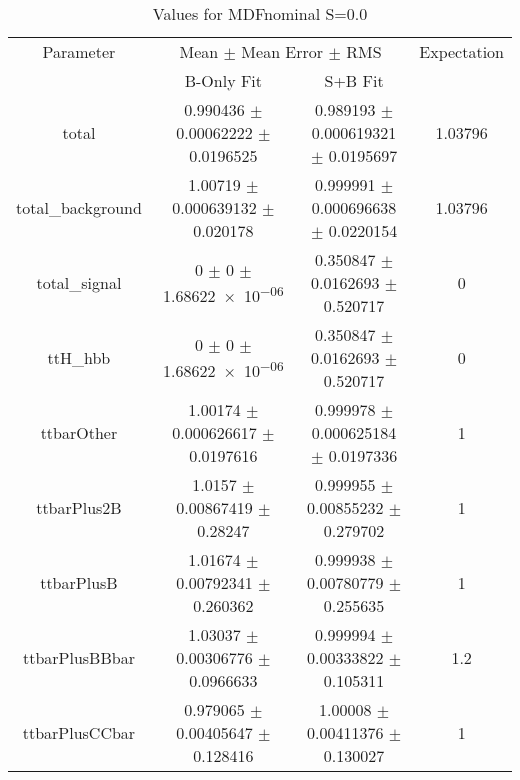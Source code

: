 \begin{table}
\centering
\caption{Values for MDFnominal S=0.0}
\begin{tabular}{cccc}
\toprule
Parameter & \multicolumn{2}{c}{Mean $\pm$ Mean Error $\pm$ RMS} & Expectation\\
 & B-Only Fit & S+B Fit & \\
\midrule
total & \num{0.990436} $\pm$ \num{0.00062222} $\pm$ \num{0.0196525} & \num{0.989193} $\pm$ \num{0.000619321} $\pm$ \num{0.0195697} & \num{1.03796}\\
total\_background & \num{1.00719} $\pm$ \num{0.000639132} $\pm$ \num{0.020178} & \num{0.999991} $\pm$ \num{0.000696638} $\pm$ \num{0.0220154} & \num{1.03796}\\
total\_signal & \num{0} $\pm$ \num{0} $\pm$ \num{1.68622e-06} & \num{0.350847} $\pm$ \num{0.0162693} $\pm$ \num{0.520717} & \num{0}\\
ttH\_hbb & \num{0} $\pm$ \num{0} $\pm$ \num{1.68622e-06} & \num{0.350847} $\pm$ \num{0.0162693} $\pm$ \num{0.520717} & \num{0}\\
ttbarOther & \num{1.00174} $\pm$ \num{0.000626617} $\pm$ \num{0.0197616} & \num{0.999978} $\pm$ \num{0.000625184} $\pm$ \num{0.0197336} & \num{1}\\
ttbarPlus2B & \num{1.0157} $\pm$ \num{0.00867419} $\pm$ \num{0.28247} & \num{0.999955} $\pm$ \num{0.00855232} $\pm$ \num{0.279702} & \num{1}\\
ttbarPlusB & \num{1.01674} $\pm$ \num{0.00792341} $\pm$ \num{0.260362} & \num{0.999938} $\pm$ \num{0.00780779} $\pm$ \num{0.255635} & \num{1}\\
ttbarPlusBBbar & \num{1.03037} $\pm$ \num{0.00306776} $\pm$ \num{0.0966633} & \num{0.999994} $\pm$ \num{0.00333822} $\pm$ \num{0.105311} & \num{1.2}\\
ttbarPlusCCbar & \num{0.979065} $\pm$ \num{0.00405647} $\pm$ \num{0.128416} & \num{1.00008} $\pm$ \num{0.00411376} $\pm$ \num{0.130027} & \num{1}\\
\bottomrule
\end{tabular}
\end{table}